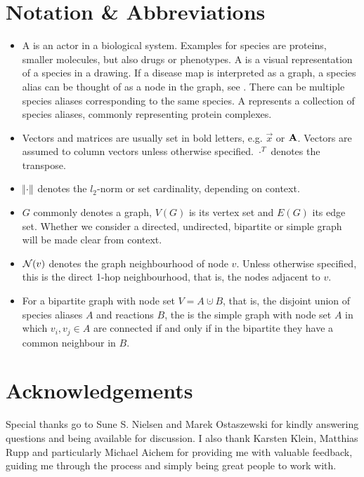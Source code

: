 \documentclass[
	fontsize=10pt, %
	twoside=true, %
	secnumdepth=1, %
  toc=indentunnumbered %
]{kaobook}
\begin{document}
\section{Notation \& Abbreviations}
\begin{itemize}
\item A  is an actor in a biological system. Examples for species
  are proteins, smaller molecules, but also drugs or phenotypes. A  is a visual representation of a species in a drawing. If a disease map
  is interpreted as a graph, a species alias can be thought of as a node in the
  graph, see . There can be multiple species
  aliases corresponding to the same species. A 
  represents a collection of species aliases, commonly representing protein
  complexes.
\item Vectors and matrices are usually set in bold letters, e.g. $\vec x$ or
  $\mathbf{A}$. Vectors are assumed to column vectors unless otherwise specified.
  $\cdot^T$ denotes the transpose.
\item $\norm{\cdot}$ denotes the $l_2$-norm or set cardinality, depending on context.
\item $G$ commonly denotes a graph, $V(G)$ is its vertex set and $E(G)$ its edge
  set. Whether we consider a directed, undirected, bipartite or simple graph
  will be made clear from context.
\item $\mathcal{N}(v)$ denotes the graph neighbourhood of node $v$. Unless otherwise
  specified, this is the direct 1-hop neighbourhood, that is, the nodes adjacent
  to $v$.
\item For a bipartite graph with node set $V = A
  \cupdot B$, that is, the disjoint union of species aliases $A$ and reactions
  $B$, the  is the simple graph with node set
  $A$ in which $v_i, v_j \in A$ are connected if and only if in the bipartite
  they have a common neighbour in $B$.
\end{itemize}




\section{Acknowledgements}

Special thanks go to Sune S. Nielsen and Marek Ostaszewski for kindly answering
questions and being available for discussion. I also thank Karsten Klein,
Matthias Rupp and particularly Michael Aichem for providing me with valuable
feedback, guiding me through the process and simply being great people to work
with.
\end{document}
